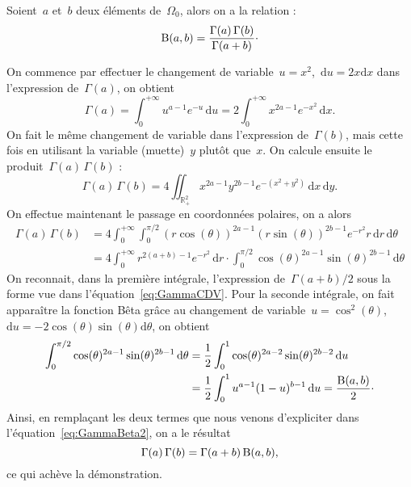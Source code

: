 		\begin{lem}	\label{lem:lienGammaBeta}
			Soient~$a$ et~$b$ deux éléments de~$\Omega_0$, alors on a la relation :
			\[
				\operatorname{B}(a,b) = \frac{\Gamma(a)\,\Gamma(b)}{\Gamma(a+b)}\cdot
			\]
		\end{lem}
		\begin{dem}
			On commence par effectuer le changement de variable~$u=x^2$,~$\mathrm{d}u=2x\mathrm{d}x$ dans l'expression de~$\Gamma(a)$, on obtient
			\begin{equation}	\label{eq:GammaCDV}
				\Gamma(a)	=	\int_{0}^{+\infty} u^{a-1}e^{-u}\,\mathrm{d}u
							=	2\int_{0}^{+\infty} x^{2a-1}e^{-x^2}\,\mathrm{d}x.
			\end{equation}
			On fait le même changement de variable dans l'expression de~$\Gamma(b)$, mais cette fois en utilisant la variable (muette)~$y$ plutôt que~$x$. On calcule ensuite le produit~$\Gamma(a)\,\Gamma(b)$ :
			\[
				\Gamma(a)\,\Gamma(b)  =	4 \iint_{\mathbb{R}_+^2} x^{2a-1}y^{2b-1} e^{-(x^2+y^2)}
															\,\mathrm{d}x\,\mathrm{d}y.
			\]
			On effectue maintenant le passage en coordonnées polaires, on a alors
			\begin{align}
				\Gamma(a)\,\Gamma(b) 	& =	4 \int_{0}^{+\infty}\int_{0}^{\pi/2} 	
												(r\cos(\theta))^{2a-1} (r\sin(\theta))^{2b-1} e^{-r^2}r\,\mathrm{d}r\,\mathrm{d}\theta\nonumber\\
									& = 4 \int_{0}^{+\infty} r^{2(a+b)-1}e^{-r^2}\,\mathrm{d}r\cdot\!
											\int_{0}^{\pi/2} \cos(\theta)^{2a-1}\sin(\theta)^{2b-1} \,\mathrm{d}\theta\label{eq:GammaBeta2}
			\end{align}
			On reconnait, dans la première intégrale, l'expression de~$\Gamma(a+b)/2$ sous la forme vue dans l'équation~\eqref{eq:GammaCDV}. Pour la seconde intégrale, on fait apparaître la fonction Bêta grâce au changement de variable~$u=\cos^2(\theta)$,~$\mathrm{d}u=-2\cos(\theta)\sin(\theta)\mathrm{d}\theta$, on obtient
			\begin{align}
				\int_{0}^{\pi/2} \cos(\theta)^{2a-1}\sin(\theta)^{2b-1} \,\mathrm{d}\theta
				& =	\frac{1}{2}\int_{0}^{1}\cos(\theta)^{2a-2}\sin(\theta)^{2b-2}\,\mathrm{d}u
						\nonumber\\
				& = \frac{1}{2}\int_{0}^{1}u^{a-1}(1-u)^{b-1}\,\mathrm{d}u = \frac{\operatorname{B}(a,b)}{2}\cdot				
													\label{eq:ecritureBeta}
			\end{align}
			Ainsi, en remplaçant les deux termes que nous venons d'expliciter dans l'équation~\eqref{eq:GammaBeta2}, on a le résultat
			\[
				\Gamma(a)\,\Gamma(b) = \Gamma(a+b)\operatorname{B}(a,b),
			\]
			ce qui achève la démonstration.
		\end{dem}
